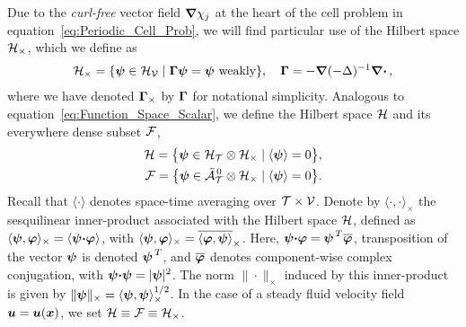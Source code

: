 \documentclass[amsa]{ipart}
\begin{document}
Due to the \emph{curl-free} vector field
$\mbox{\boldmath${\nabla}$}\chi_j$ at the heart of the cell problem in
equation~\eqref{eq:Periodic_Cell_Prob}, we will find particular use of
the Hilbert space $\mathcal{H}_\times$, which we define as 
%
\begin{align}\label{eq:Hilbert_Curl_Free}
  \Hc_\times=\{\vecpsi\in\Hc_{\Vc} \; | \; \bGamma\vecpsi=\vecpsi \text{ weakly}\},
  \quad
  \bGamma=-\bnabla(-\Delta)^{-1}\bnabla \bcdot\,,
\end{align}
%
where we have denoted $\mbox{\boldmath${\Gamma}$}_\times$ by $\mbox{\boldmath${\Gamma}$}$ for notational
simplicity.
Analogous to
equation~\eqref{eq:Function_Space_Scalar}, we define the Hilbert space
$\mathcal{H}$ and its everywhere dense subset $\mathcal{F}$,   
%
\begin{align}\label{eq:Function_Space_Vector} 
  \Hc=\big\{\bpsi\in\Hc_{\Tc}\otimes\Hc_\times \; | \; \langle\bpsi\rangle=0\big\}, \\
  \Fc=\big\{\bpsi\in\tilde{\Ac}^{\,0}_{\Tc}\otimes\Hc_\times \; | \; \langle\bpsi\rangle=0\big\}.
  \notag
\end{align}
%
Recall that $\langle\cdot\rangle$ denotes space-time averaging over $\mathcal{T}\times\mathcal{V}$. Denote
by $\langle\cdot,\cdot\rangle_\times$ the sesquilinear inner-product associated with the Hilbert
space $\mathcal{H}$, defined as $\langle\boldsymbol{\psi},\boldsymbol{\varphi}\rangle_\times=\langle\boldsymbol{\psi}\mbox{\boldmath${\cdot}$}\boldsymbol{\varphi}\rangle$, 
with $\langle\boldsymbol{\psi},\boldsymbol{\varphi}\rangle_\times=\overline{\langle\boldsymbol{\varphi},\boldsymbol{\psi}\rangle}_\times$. Here,
$\boldsymbol{\psi}\mbox{\boldmath${\cdot}$}\boldsymbol{\varphi}=\boldsymbol{\psi}^{\,T}\overline{\boldsymbol{\varphi}}$,
transposition of the vector $\boldsymbol{\psi}$ is denoted $\boldsymbol{\psi}^{\,T}$, and
$\overline{\boldsymbol{\varphi}}$ denotes component-wise complex conjugation,
with $\boldsymbol{\psi}\mbox{\boldmath${\cdot}$}\boldsymbol{\psi}=|\boldsymbol{\psi}|^2$. The norm $\|\cdot\|_\times$ induced by
this inner-product is given by $\|\boldsymbol{\psi}\|_\times=\langle\boldsymbol{\psi},\boldsymbol{\psi}\rangle_\times^{1/2}$. In
the case of a steady fluid velocity field $\boldsymbol{u}=\boldsymbol{u}(\boldsymbol{x})$, we set
$\mathcal{H}\equiv\mathcal{F}\equiv\mathcal{H}_\times$. 
\end{document}
